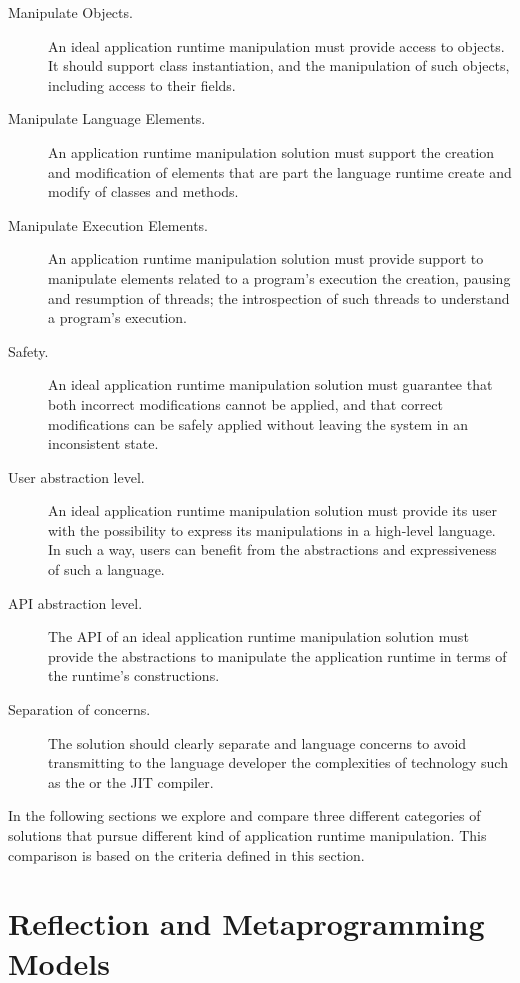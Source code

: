 \begin{description}

\item[Manipulate Objects.] An ideal application runtime manipulation must provide access to objects. It should support class instantiation, and the manipulation of such objects, including access to their fields.
\item[Manipulate Language Elements.] An application runtime manipulation solution must support the creation and modification of elements that are part the language runtime \eg create and modify of classes and methods.
\item[Manipulate Execution Elements.] An application runtime manipulation solution must provide support to manipulate elements related to a program's execution \eg the creation, pausing and resumption of threads; the introspection of such threads to understand a program's execution.

\item[Safety.] An ideal application runtime manipulation solution must guarantee that both incorrect modifications cannot be applied, and that correct modifications can be safely applied without leaving the system in an inconsistent state.

\item[User abstraction level.] An ideal application runtime manipulation solution must provide its user with the possibility to express its manipulations in a high-level language. In such a way, users can benefit from the abstractions and expressiveness of such a language.

\item[API abstraction level.] The API of an ideal application runtime manipulation solution must provide the abstractions to manipulate the application runtime in terms of the runtime's constructions.

\item[Separation of concerns.] The solution should clearly separate \VM and language concerns to avoid transmitting to the language developer the complexities of \VM technology such as the \GC or the JIT compiler.

\end{description}

In the following sections we explore and compare three different categories of solutions that pursue different kind of application runtime manipulation. This comparison is based on the criteria defined in this section.

\section{Reflection and Metaprogramming Models}\label{sec:related_work_changing}

